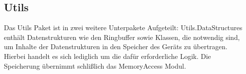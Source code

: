 \label{app:module:utils}\subsection{Utils}
Das Utils Paket ist in zwei weitere Unterpakete Aufgeteilt: Utils.DataStructures enthält Datenstrukturen wie den Ringbuffer sowie Klassen, die notwendig sind, um Inhalte der Datenstrukturen in den Speicher des Geräts zu übertragen. Hierbei handelt es sich lediglich um die dafür erforderliche Logik. Die Speicherung übernimmt schlißlich das MemoryAccess Modul.